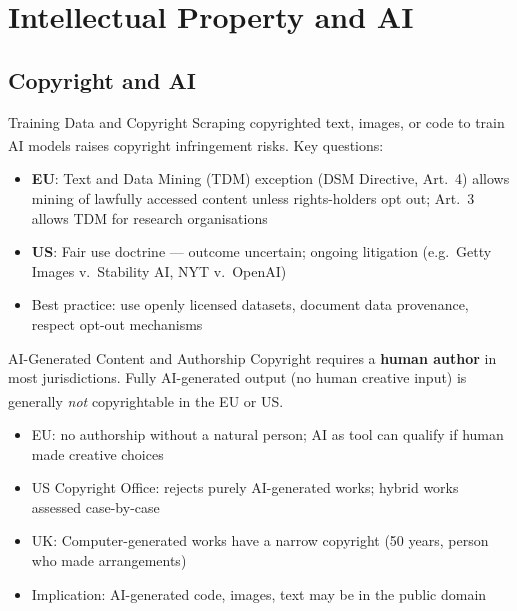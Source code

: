 \section{Intellectual Property and AI}

\subsection{Copyright and AI}

\begin{v3topic}{Training Data and Copyright}
    Scraping copyrighted text, images, or code to train AI models raises copyright infringement risks.
    Key questions\textsuperscript{\cite[][pp.~150--180]{lloydInformationTechnologyLaw2020}}:
\visualseparator
    \begin{itemize}
        \item \textbf{EU}: Text and Data Mining (TDM) exception (DSM Directive, Art.\ 4) allows mining of lawfully accessed content unless rights-holders opt out; Art.\ 3 allows TDM for research organisations
        \item \textbf{US}: Fair use doctrine — outcome uncertain; ongoing litigation (e.g.\ Getty Images v.\ Stability AI, NYT v.\ OpenAI)
        \item Best practice: use openly licensed datasets, document data provenance, respect opt-out mechanisms
    \end{itemize}

\end{v3topic}
\begin{v3topic}{AI-Generated Content and Authorship}
    Copyright requires a \textbf{human author} in most jurisdictions.
    Fully AI-generated output (no human creative input) is generally \emph{not} copyrightable in the EU or US\textsuperscript{\cite[][pp.~185--200]{lloydInformationTechnologyLaw2020}}.
\visualseparator
    \begin{itemize}
        \item EU: no authorship without a natural person; AI as tool can qualify if human made creative choices
        \item US Copyright Office: rejects purely AI-generated works; hybrid works assessed case-by-case
        \item UK: Computer-generated works have a narrow copyright (50 years, person who made arrangements)
        \item Implication: AI-generated code, images, text may be in the public domain
    \end{itemize}
\end{v3topic}

